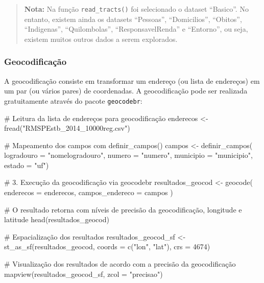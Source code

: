 \documentclass[
  letterpaper,
  DIV=11,
  numbers=noendperiod]{scrreprt}
\newenvironment{Shaded}{\begin{snugshade}}{\end{snugshade}}
\newcommand{\AttributeTok}[1]{\textcolor[rgb]{0.40,0.45,0.13}{#1}}
\newcommand{\CommentTok}[1]{\textcolor[rgb]{0.37,0.37,0.37}{#1}}
\newcommand{\DecValTok}[1]{\textcolor[rgb]{0.68,0.00,0.00}{#1}}
\newcommand{\FunctionTok}[1]{\textcolor[rgb]{0.28,0.35,0.67}{#1}}
\newcommand{\NormalTok}[1]{\textcolor[rgb]{0.00,0.23,0.31}{#1}}
\newcommand{\OtherTok}[1]{\textcolor[rgb]{0.00,0.23,0.31}{#1}}
\newcommand{\StringTok}[1]{\textcolor[rgb]{0.13,0.47,0.30}{#1}}
\begin{document}
\begin{quote}
\textbf{Nota:} Na função \texttt{read\_tracts()} foi selecionado o
dataset ``Basico''. No entanto, existem ainda os datasets ``Pessoas'',
``Domicilios'', ``Obitos'', ``Indigenas'', ``Quilombolas'',
``ResponsavelRenda'' e ``Entorno'', ou seja, existem muitos outros dados
a serem explorados.
\end{quote}

\subsubsection{\texorpdfstring{\textbf{Geocodificação}}{Geocodificação}}\label{geocodificauxe7uxe3o}

A geocodificação consiste em transformar um endereço (ou lista de
endereços) em um par (ou vários pares) de coordenadas. A geocodificação
pode ser realizada gratuitamente através do pacote \texttt{geocodebr}:

\begin{Shaded}
\begin{Highlighting}[]
\CommentTok{\# Leitura da lista de endereços para geocodificação}
\NormalTok{enderecos }\OtherTok{\textless{}{-}} \FunctionTok{fread}\NormalTok{(}\StringTok{"RMSPEstb\_2014\_10000reg.csv"}\NormalTok{)}
  
\CommentTok{\# Mapeamento dos campos com definir\_campos()}
\NormalTok{campos }\OtherTok{\textless{}{-}} \FunctionTok{definir\_campos}\NormalTok{(}
  \AttributeTok{logradouro =} \StringTok{"nomelogradouro"}\NormalTok{,}
  \AttributeTok{numero =} \StringTok{"numero"}\NormalTok{,}
  \AttributeTok{municipio =} \StringTok{"municipio"}\NormalTok{,}
  \AttributeTok{estado =} \StringTok{"uf"}\NormalTok{)}

\CommentTok{\# 3. Execução da geocodificação via geocodebr}
\NormalTok{resultados\_geocod }\OtherTok{\textless{}{-}} \FunctionTok{geocode}\NormalTok{(}
  \AttributeTok{enderecos =}\NormalTok{ enderecos,}
  \AttributeTok{campos\_endereco =}\NormalTok{ campos}
\NormalTok{)}

\CommentTok{\# O resultado retorna com níveis de precisão da geocodificação, longitude e latitude }
\FunctionTok{head}\NormalTok{(resultados\_geocod)}

\CommentTok{\# Espacialização dos resultados}
\NormalTok{resultados\_geocod\_sf }\OtherTok{\textless{}{-}} \FunctionTok{st\_as\_sf}\NormalTok{(resultados\_geocod, }\AttributeTok{coords =} \FunctionTok{c}\NormalTok{(}\StringTok{"lon"}\NormalTok{, }\StringTok{"lat"}\NormalTok{), }\AttributeTok{crs =} \DecValTok{4674}\NormalTok{)}

\CommentTok{\# Visualização dos resultados de acordo com a precisão da geocodificação}
\FunctionTok{mapview}\NormalTok{(resultados\_geocod\_sf, }\AttributeTok{zcol =} \StringTok{"precisao"}\NormalTok{)}
\end{Highlighting}
\end{Shaded}
\end{document}
